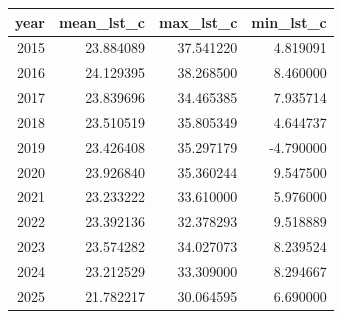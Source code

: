 \begin{tabular}{rrrr}
\toprule
year & mean\_lst\_c & max\_lst\_c & min\_lst\_c \\
\midrule
2015 & 23.884089 & 37.541220 & 4.819091 \\
2016 & 24.129395 & 38.268500 & 8.460000 \\
2017 & 23.839696 & 34.465385 & 7.935714 \\
2018 & 23.510519 & 35.805349 & 4.644737 \\
2019 & 23.426408 & 35.297179 & -4.790000 \\
2020 & 23.926840 & 35.360244 & 9.547500 \\
2021 & 23.233222 & 33.610000 & 5.976000 \\
2022 & 23.392136 & 32.378293 & 9.518889 \\
2023 & 23.574282 & 34.027073 & 8.239524 \\
2024 & 23.212529 & 33.309000 & 8.294667 \\
2025 & 21.782217 & 30.064595 & 6.690000 \\
\bottomrule
\end{tabular}
